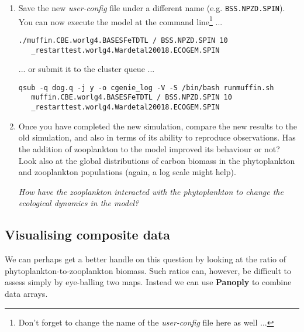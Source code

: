 \documentclass[11pt,fleqn]{book} %
\begin{document}
\begin{enumerate}[noitemsep]
\vspace{1mm}
\item Save the new \textit{user-config} file under a different name (e.g. \texttt{BSS.NPZD.SPIN}). You can now execute the model at the command line\footnote{Don't forget to change the name of the \textit{user-config} file here as well ...} ...
\small\begin{verbatim}
./muffin.CBE.worlg4.BASESFeTDTL / BSS.NPZD.SPIN 10
   _restarttest.worlg4.Wardetal20018.ECOGEM.SPIN
\end{verbatim}\normalsize
... or submit it to the cluster queue ...
\small\begin{verbatim}
qsub -q dog.q -j y -o cgenie_log -V -S /bin/bash runmuffin.sh
   muffin.CBE.worlg4.BASESFeTDTL / BSS.NPZD.SPIN 10
   _restarttest.worlg4.Wardetal20018.ECOGEM.SPIN
\end{verbatim}\normalsize

\vspace{1mm}
\item Once you have completed the new simulation, compare the new results to the old simulation, and also in terms of its ability to reproduce observations. Has the addition of zooplankton to the model improved its behaviour or not? Look also at the global distributions of carbon biomass in the phytoplankton and zooplankton populations (again, a log scale might help).

\vspace{1mm}
\textit{How have the zooplankton interacted with the phytoplankton to change the ecological dynamics in the model?}

\end{enumerate}
\vspace{2mm}


\subsection{Visualising composite data}

We can perhaps get a better handle on this question by looking at the ratio of phytoplankton-to-zooplankton biomass. Such ratios can, however, be difficult to assess simply by eye-balling two maps. Instead we can use \textbf{Panoply} to combine data arrays.
\end{document}
